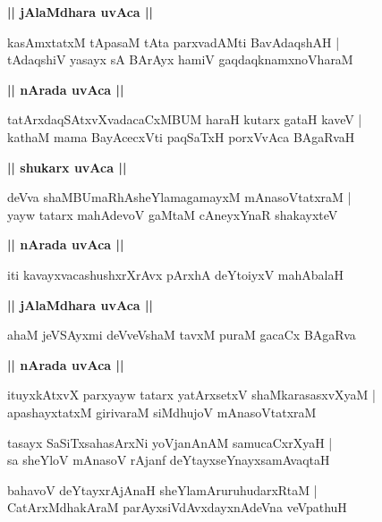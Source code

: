 \documentclass[twoside,12pt,openright]{book}
\newcounter{shloka}[chapter]
\def\uvaca#1{\centerline{{\large\textbf{#1}}}}
\begin{document}
\uvaca{|| jAlaMdhara uvAca ||}

\begin{shloka}%
kasAmxtatxM tApasaM tAta parxvadAMti BavAdaqshAH |\\
tAdaqshiV yasayx sA BArAyx hamiV gaqdaqknamxnoVharaM
\end{shloka}

\uvaca{|| nArada uvAca ||}

\begin{shloka}%
tatArxdaqSAtxvXvadacaCxMBUM haraH kutarx gataH kaveV |\\
kathaM mama BayAcecxVti paqSaTxH porxVvAca BAgaRvaH 
\end{shloka}

\uvaca{|| shukarx uvAca ||}

\begin{shloka}%
deVva shaMBUmaRhAsheYlamagamayxM mAnasoVtatxraM |\\
yayw tatarx mahAdevoV gaMtaM cAneyxYnaR shakayxteV 
\end{shloka}

\uvaca{|| nArada uvAca ||}

\begin{shloka}%
iti kavayxvacashushxrXrAvx pArxhA deYtoiyxV mahAbalaH 
\end{shloka}

\uvaca{|| jAlaMdhara uvAca ||}

\begin{shloka}%
ahaM jeVSAyxmi deVveVshaM tavxM puraM gacaCx BAgaRva 
\end{shloka}

\uvaca{|| nArada uvAca ||}

\begin{shloka}%
ituyxkAtxvX parxyayw tatarx yatArxsetxV shaMkarasasxvXyaM |\\
apashayxtatxM girivaraM siMdhujoV mAnasoVtatxraM 
\end{shloka}

\begin{shloka}%
tasayx SaSiTxsahasArxNi yoVjanAnAM samucaCxrXyaH |\\
sa sheYloV mAnasoV rAjanf deYtayxseYnayxsamAvaqtaH 
\end{shloka}

\begin{shloka}%
bahavoV deYtayxrAjAnaH sheYlamAruruhudarxRtaM |\\
CatArxMdhakAraM parAyxsiVdAvxdayxnAdeVna veVpathuH 
\end{shloka}
\end{document}
